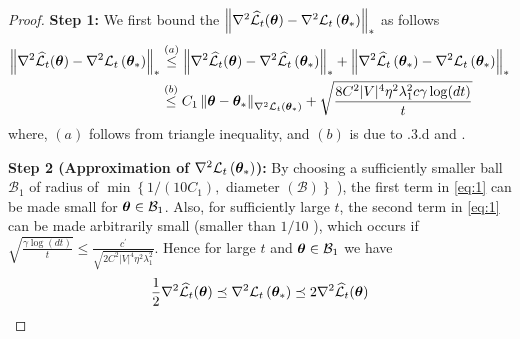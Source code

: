 \begin{proof}
\textbf{Step 1:} We first bound the $\left\|\nabla^{2} \widehat{\cal L}_{t}(\bm{\theta})-\nabla^{2} {\cal L}_t\left(\bm{\theta}_{*}\right)\right\|_{*}$ as follows
\begin{align}
\left\|\nabla^{2} \widehat{\cal L}_{t}(\bm{\theta})-\nabla^{2} {\cal L}_t\left(\bm{\theta}_{*}\right)\right\|_{*} & \overset{(a)}{\leq}\left\|\nabla^{2} \widehat{\cal L}_{t}(\bm{\theta})-\nabla^{2} \widehat{\cal L}_{t}\left(\bm{\theta}_{*}\right)\right\|_{*}+\left\|\nabla^{2} \widehat{\cal L}_{t}\left(\bm{\theta}_{*}\right)-\nabla^{2} {\cal L}_t\left(\bm{\theta}_{*}\right)\right\|_{*} \nonumber\\
& \overset{(b)}{\leq} C_{1}\left\|\bm{\theta}-\bm{\theta}_{*}\right\|_{\nabla^{2} {\cal L}_t\left(\bm{\theta}_{*}\right)}+ \sqrt{\dfrac{8C^2|V|^4\eta^2\lambda_1^2c \gamma\log(dt)}{t}}\label{eq:1}
\end{align}
where, $(a)$ follows from triangle inequality, and $(b)$ is due to .3.d and .

\textbf{Step 2 (Approximation of $\nabla^{2} {\cal L}_t\left(\bm{\theta}_{*}\right)$):} By choosing a sufficiently smaller ball $\mathcal{B}_{1}$ of radius of $\min \left\{1 /\left(10 C_{1}\right), \right.$ diameter $\left.(\mathcal{B})\right\}$ ), the first term in \eqref{eq:1} can be made small for $\bm{\theta} \in \mathcal{B}_{1}$. Also, for sufficiently large $t$, the second term in \eqref{eq:1} can be made arbitrarily small (smaller than $1 / 10$ ), which occurs if $\sqrt{\frac{\gamma \log (dt)}{t}} \leq \frac{c^{\prime}}{\sqrt{2C^2|V|^4\eta^2\lambda_1^2}}$. Hence for large $t$ and $\bm{\theta}\in \mathcal{B}_1$ we have 
\begin{align}
    \frac{1}{2} \nabla^{2} \widehat{\cal L}_{t}(\bm{\theta}) \preceq \nabla^{2} {\cal L}_t\left(\bm{\theta}_{*}\right) \preceq 2 \nabla^{2} \widehat{\cal L}_{t}(\bm{\theta}) \label{eq:relation}
\end{align}


\end{proof}

